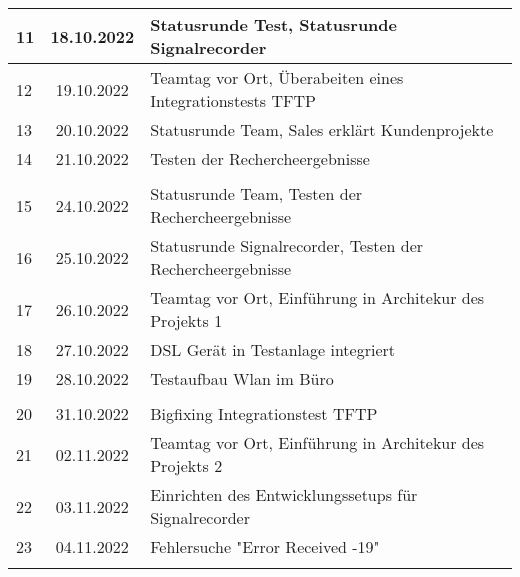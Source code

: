 \begin{longtable}{|l|c|l|}
11  & 18.10.2022    & Statusrunde Test, Statusrunde Signalrecorder                                                      \\ \hline   
12  & 19.10.2022    & Teamtag vor Ort, Überabeiten eines Integrationstests TFTP                                                      \\ \hline   
13  & 20.10.2022    & Statusrunde Team, Sales erklärt Kundenprojekte                                                      \\ \hline   
14  & 21.10.2022    & Testen der Rechercheergebnisse                                                      \\ \hline  
    &               &                                                       \\ \hline 
15  & 24.10.2022    & Statusrunde Team, Testen der Rechercheergebnisse                                                   \\ \hline   
16  & 25.10.2022    & Statusrunde Signalrecorder, Testen der Rechercheergebnisse                                                      \\ \hline   
17  & 26.10.2022    & Teamtag vor Ort, Einführung in Architekur des Projekts 1                                                      \\ \hline   
18  & 27.10.2022    & DSL Gerät in Testanlage integriert                                                      \\ \hline   
19  & 28.10.2022    & Testaufbau Wlan im Büro                                                      \\ \hline 
    &               &                                                       \\ \hline
20  & 31.10.2022    & Bigfixing Integrationstest TFTP                                                      \\ \hline   
21  & 02.11.2022    & Teamtag vor Ort, Einführung in Architekur des Projekts 2                                                        \\ \hline   
22  & 03.11.2022    & Einrichten des Entwicklungssetups für Signalrecorder                                                      \\ \hline   
23  & 04.11.2022    & Fehlersuche "Error Received -19"                                                      \\ \hline 
&               &                                                       \\ \hline 

\end{longtable}
